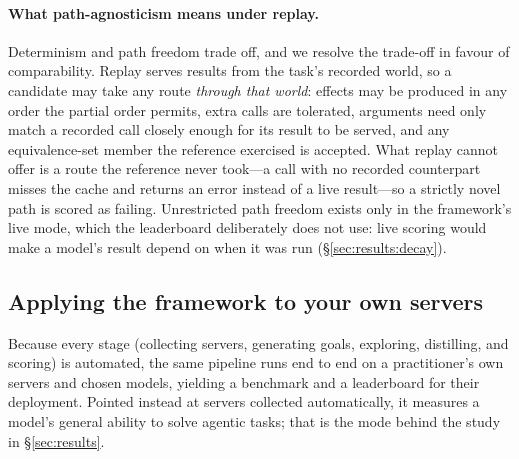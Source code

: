 \paragraph{What path-agnosticism means under replay.} Determinism and path
freedom trade off, and we resolve the trade-off in favour of comparability.
Replay serves results from the task's recorded world, so a candidate may take
any route \emph{through that world}: effects may be produced in any order the
partial order permits, extra calls are tolerated, arguments need only match a
recorded call closely enough for its result to be served, and any
equivalence-set member the reference exercised is accepted. What replay cannot
offer is a route the reference never took---a call with no recorded
counterpart misses the cache and returns an error instead of a live
result---so a strictly novel path is scored as failing. Unrestricted path
freedom exists only in the framework's live mode, which the leaderboard
deliberately does not use: live scoring would make a model's result depend on
when it was run (\S\ref{sec:results:decay}).

\subsection{Applying the framework to your own servers}
\label{sec:benchmark:apply}
Because every stage (collecting servers, generating goals, exploring,
distilling, and scoring) is automated, the same pipeline runs end to end on
a practitioner's own servers and chosen models, yielding a benchmark and a
leaderboard for their deployment. Pointed instead at servers collected
automatically, it measures a model's general ability to solve agentic tasks;
that is the mode behind the study in \S\ref{sec:results}.
